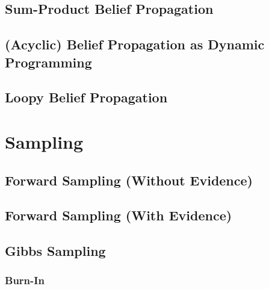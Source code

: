         \subsection{Sum-Product Belief Propagation} %

        \subsection{(Acyclic) Belief Propagation as Dynamic Programming} %

        \subsection{Loopy Belief Propagation} %

    \section{Sampling} %

        \subsection{Forward Sampling (Without Evidence)} %

        \subsection{Forward Sampling (With Evidence)} %

        \subsection{Gibbs Sampling} %

            \subsubsection{Burn-In} %

